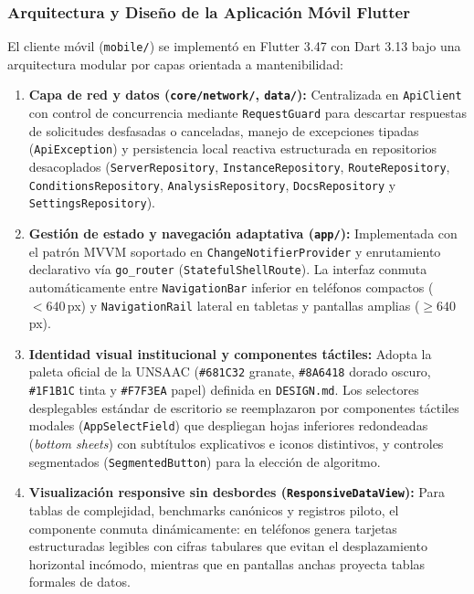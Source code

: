 \subsubsection{Arquitectura y Diseño de la Aplicación Móvil Flutter}
El cliente móvil (\texttt{mobile/}) se implementó en Flutter 3.47 con Dart 3.13 bajo una arquitectura modular por capas orientada a mantenibilidad:
\begin{enumerate}
    \item \textbf{Capa de red y datos (\texttt{core/network/}, \texttt{data/}):} Centralizada en \texttt{ApiClient} con control de concurrencia mediante \texttt{RequestGuard} para descartar respuestas de solicitudes desfasadas o canceladas, manejo de excepciones tipadas (\texttt{ApiException}) y persistencia local reactiva estructurada en repositorios desacoplados (\texttt{ServerRepository}, \texttt{InstanceRepository}, \texttt{RouteRepository}, \texttt{ConditionsRepository}, \texttt{AnalysisRepository}, \texttt{DocsRepository} y \texttt{SettingsRepository}).
    \item \textbf{Gestión de estado y navegación adaptativa (\texttt{app/}):} Implementada con el patrón MVVM soportado en \texttt{ChangeNotifierProvider} y enrutamiento declarativo vía \texttt{go\_router} (\texttt{StatefulShellRoute}). La interfaz conmuta automáticamente entre \texttt{NavigationBar} inferior en teléfonos compactos ($<640$\,px) y \texttt{NavigationRail} lateral en tabletas y pantallas amplias ($\ge640$\,px).
    \item \textbf{Identidad visual institucional y componentes táctiles:} Adopta la paleta oficial de la UNSAAC (\texttt{\#681C32} granate, \texttt{\#8A6418} dorado oscuro, \texttt{\#1F1B1C} tinta y \texttt{\#F7F3EA} papel) definida en \texttt{DESIGN.md}. Los selectores desplegables estándar de escritorio se reemplazaron por componentes táctiles modales (\texttt{AppSelectField}) que despliegan hojas inferiores redondeadas (\textit{bottom sheets}) con subtítulos explicativos e iconos distintivos, y controles segmentados (\texttt{SegmentedButton}) para la elección de algoritmo.
    \item \textbf{Visualización responsive sin desbordes (\texttt{ResponsiveDataView}):} Para tablas de complejidad, benchmarks canónicos y registros piloto, el componente conmuta dinámicamente: en teléfonos genera tarjetas estructuradas legibles con cifras tabulares que evitan el desplazamiento horizontal incómodo, mientras que en pantallas anchas proyecta tablas formales de datos.
\end{enumerate}

